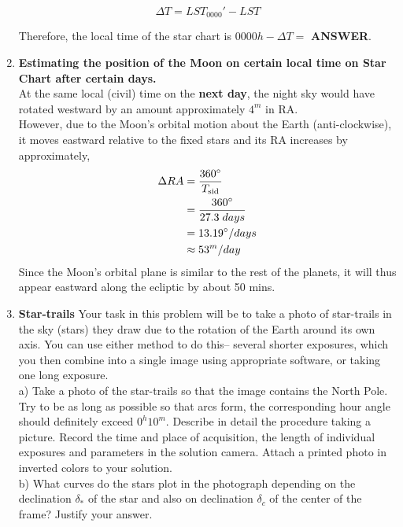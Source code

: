 \documentclass[a4paper,12pt]{extarticle}
\begin{document}
\begin{enumerate}
$$\Delta T=LST_{0000}'-LST$$

Therefore, the local time of the star chart is $0000h -\Delta T =$ \textbf{ANSWER}. 

\item \textbf{Estimating the position of the Moon on certain local time on Star Chart after certain days.}\\

At the same local (civil) time on the \textbf{next day}, the night sky would have rotated westward by an amount approximately $4^m$ in RA.\\

However, due to the Moon's orbital motion about the Earth (anti-clockwise), it moves eastward relative to the fixed stars and its RA increases by approximately,
\begin{align*}
	\Delta RA&=\frac{360^\circ}{T_{\rm sid}}\\
	&=\frac{360^\circ}{27.3\; days}\\
	&=13.19^\circ /days\\
	& \approx 53^m/day
\end{align*}
Since the Moon's orbital plane is similar to the rest of the planets, it will thus appear eastward along the ecliptic by about 50 mins.

\item \textbf{Star-trails} Your task in this problem will be to take a photo of star-trails in the sky (stars) they draw due to the rotation of the Earth around its own axis. You can use either method to do this-- several shorter exposures, which you then combine into a single image using appropriate software, or taking one long exposure.\\

a) Take a photo of the star-trails so that the image contains the North Pole. Try to be as long as possible so that arcs form, the corresponding hour angle should definitely exceed $0^h10^m$. Describe in detail the procedure taking a picture. Record the time and place of acquisition, the length of individual exposures and parameters in the solution camera. Attach a printed photo in inverted colors to your solution.\\ 

b) What curves do the stars plot in the photograph depending on the declination $\delta_\ast$ of the star and also on
declination $\delta_c$ of the center of the frame? Justify your answer.\\


\end{enumerate}
\end{document}
